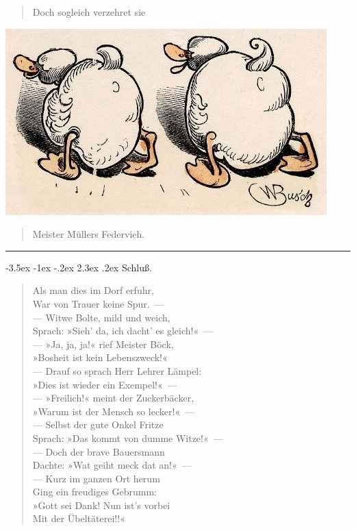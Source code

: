 \documentclass[a4paper,12pt]{article}
\makeatletter
\renewcommand\section{\@startsection {section}{1}{\z@}%
                                   {-3.5ex \@plus -1ex \@minus -.2ex}%
                                   {2.3ex \@plus.2ex}%
                                   {\centering\normalfont\LARGE\bfseries}}
\makeatother
\begin{document}
\begin{verse}
Doch sogleich verzehret sie
\end{verse}



\begin{center}\includegraphics[scale=.7, alt={... vom Federvieh}]{images/7-13.jpg}\end{center}



\begin{verse}
Meister Müllers Federvieh.
\end{verse}


\hrule


\clearpage
\section{Schluß.\label{Schluss}}


\begin{verse}
Als man dies im Dorf erfuhr,\\{}
War von Trauer keine Spur.~—\\{}
— Witwe Bolte, mild und weich,\\{}
Sprach: »Sieh' da, ich dacht' es gleich!«~—\\{}
— »Ja, ja, ja!« rief Meister Böck,\\{}
»Bosheit ist kein Lebenszweck!«\\{}
— Drauf so sprach Herr Lehrer Lämpel:\\{}
»Dies ist wieder ein Exempel!«~—\\{}
— »Freilich!« meint der Zuckerbäcker,\\{}
»Warum ist der Mensch so lecker!«~—\\{}
— Selbst der gute Onkel Fritze\\{}
Sprach: »Das kommt von dumme Witze!«~—\\{}
— Doch der brave Bauersmann\\{}
Dachte: »Wat geiht meck dat an!«~—\\{}
— Kurz im ganzen Ort herum\\{}
Ging ein freudiges Gebrumm:\\{}
»Gott sei Dank! Nun ist's vorbei\\{}
Mit der Übeltäterei!!«
\end{verse}
\end{document}
